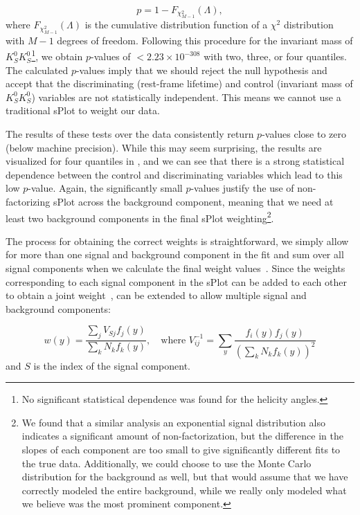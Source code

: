 \begin{equation}
  p = 1 - F_{\chi^2_{M-1}}(\Lambda),
  \label{eq:significance-test}
\end{equation}
where $F_{\chi^2_{M-1}}(\Lambda)$ is the cumulative distribution function of a $\chi^2$ distribution with $M-1$ degrees of freedom. Following this procedure for the invariant mass of $K_S^0K_S^0$\footnote{No significant statistical dependence was found for the helicity angles.}, we obtain $p$-values of $<2.23\times10^{-308}$ with two, three, or four quantiles. The calculated $p$-values imply that we should reject the null hypothesis and accept that the discriminating (rest-frame lifetime) and control (invariant mass of $K_S^0K_S^0$) variables are not statistically independent. This means we cannot use a traditional sPlot to weight our data.

The results of these tests over the data consistently return $p$-values close to zero (below machine precision). While this may seem surprising, the results are visualized for four quantiles in , and we can see that there is a strong statistical dependence between the control and discriminating variables which lead to this low $p$-value. Again, the significantly small $p$-values justify the use of non-factorizing sPlot across the background component, meaning that we need at least two background components in the final sPlot weighting\footnote{We found that a similar analysis an exponential signal distribution also indicates a significant amount of non-factorization, but the difference in the slopes of each component are too small to give significantly different fits to the true data. Additionally, we could choose to use the Monte Carlo distribution for the background as well, but that would assume that we have correctly modeled the entire background, while we really only modeled what we believe was the most prominent component.}.

The process for obtaining the correct weights is straightforward, we simply allow for more than one signal and background component in the fit and sum over all signal components when we calculate the final weight values~\cite{Dembinski2022}. Since the weights corresponding to each signal component in the sPlot can be added to each other to obtain a joint weight~\cite{Pivk2005},  can be extended to allow multiple signal and background components:

\begin{equation}
  w(y) = \frac{\sum_{j} V_{Sj}f_j(y)}{\sum_{k}N_kf_k(y)},\quad \text{where } V_{ij}^{-1} = \sum_{y} \frac{f_i(y)f_j(y)}{\left(\sum_{k} N_kf_k(y)\right)^2}
  \label{eq:splot-weights-factorizing}
\end{equation}
and $S$ is the index of the signal component.


